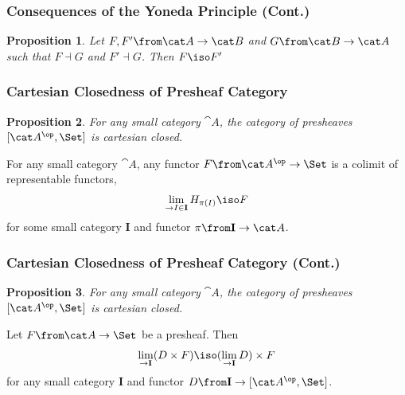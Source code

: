 \documentclass{beamer}
\newtheorem{proposition}{Proposition}
\begin{document}
\begin{frame}
  \frametitle{Consequences of the Yoneda Principle (Cont.)}
  \begin{proposition}
    Let $F,F'\from \cat A\to\cat B$ and $G\from\cat B\to\cat A$ such that $F\dashv G$ and $F'\dashv G$. Then $F\iso F'$
  \end{proposition}
\end{frame}

\begin{frame}
  \frametitle{Cartesian Closedness of Presheaf Category}
  \begin{proposition}
    For any small category $\cat A$, the category of presheaves $[\cat A^\op,\Set]$ is cartesian closed.
  \end{proposition}
  \pause
  \begin{lemma}
    For any small category $\cat A$, any functor $F\from\cat A^\op\to\Set$ is a colimit of representable functors,
    \begin{align*}
      \lim_{\to I\in\mathbf I} H_{\pi(I)}\iso F
    \end{align*}
    for some small category $\mathbf I$ and functor $\pi\from \mathbf I\to \cat A$.
  \end{lemma}
\end{frame}

\begin{frame}
  \frametitle{Cartesian Closedness of Presheaf Category (Cont.)}  
  \begin{proposition}
    For any small category $\cat A$, the category of presheaves $[\cat A^\op,\Set]$ is cartesian closed.
  \end{proposition}
  \pause
  \begin{lemma}
    Let $F\from \cat A\to\Set$ be a presheaf. Then
    \begin{align*}
      \lim_{\to \mathbf I} (D\times F)\iso (\lim_{\to \mathbf I} D)\times F
    \end{align*}
    for any small category $\mathbf I$ and functor $D\from\mathbf I\to [\cat A^\op,\Set]$.
  \end{lemma}
\end{frame}
\end{document}
